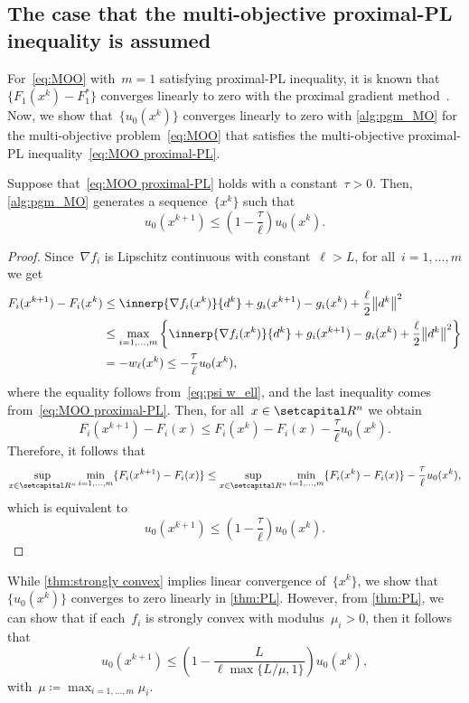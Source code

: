 \documentclass[../../main]{subfiles}
\begin{document}
\subsection{The case that the multi-objective proximal-PL inequality is assumed}
For~\cref{eq:MOO} with~$m = 1$ satisfying proximal-PL inequality, it is known that~$\{ F_1(x^k) - F_1^\ast \}$ converges linearly to zero with the proximal gradient method~\cite{Karimi2016}.
Now, we show that~$\{u_0(x^k)\}$ converges linearly to zero with \cref{alg:pgm_MO} for the multi-objective problem~\cref{eq:MOO} that satisfies the multi-objective proximal-PL inequality~\cref{eq:MOO proximal-PL}.
\begin{theorem} \label{thm:PL}
    Suppose that~\cref{eq:MOO proximal-PL} holds with a constant~$\tau > 0$.
    Then, \cref{alg:pgm_MO} generates a sequence~$\{ x^k \}$ such that
    \[
        u_0 (x^{k + 1}) \le \left( 1 - \frac{\tau}{\ell} \right) u_0(x^k).
    \]
\end{theorem}
\begin{proof}
    Since~$\nabla f_i$ is Lipschitz continuous with constant~$\ell > L$, for all~$i = 1, \dots, m$ we get
    \[
        \begin{split}
            F_i(x^{k + 1}) - F_i(x^k) &\le \innerp{\nabla f_i(x^k)}{d^k} + g_i(x^{k + 1}) - g_i(x^k) + \frac{\ell}{2}\norm*{ d^k}^2 \\
                                      &\le \max_{i = 1, \dots, m} \left\{ \innerp{\nabla f_i(x^k)}{d^k} + g_i(x^{k + 1}) - g_i(x^k) + \frac{\ell}{2}\norm*{ d^k}^2 \right\} \\
                                      &= - w_\ell(x^k)
        \le - \frac{\tau}{\ell} u_0(x^k)
        ,\end{split}
    \]
    where the equality follows from~\cref{eq:psi w_ell}, and the last inequality comes from~\cref{eq:MOO proximal-PL}.
    Then, for all~$x \in \setR^n$ we obtain
    \[
        F_i(x^{k + 1}) - F_i(x) \le F_i(x^k) - F_i(x) - \frac{\tau}{\ell} u_0(x^k)
    .\]
    Therefore, it follows that
    \[
        \sup_{x \in \setR^n} \min_{i = 1, \dots, m} \{ F_i(x^{k + 1}) - F_i(x) \} \le \sup_{x \in \setR^n} \min_{i = 1, \dots, m} \{ F_i(x^k) - F_i(x) \} - \frac{\tau}{\ell} u_0(x^k),
    \]
    which is equivalent to
    \[
        u_0 (x^{k + 1}) \le \left( 1 - \frac{\tau}{\ell} \right) u_0(x^k).
    \]
\end{proof}

\begin{remark}
    While \cref{thm:strongly convex} implies linear convergence of~$\{x^k\}$, we show that~$\{u_0(x^k)\}$ converges to zero linearly in \cref{thm:PL}.
    However, from \cref{thm:PL}, we can show that if each~$f_i$ is strongly convex with modulus~$\mu_i > 0$, then it follows that
    \[
        u_0 (x^{k + 1}) \le \left( 1 - \frac{L}{\ell \max \{L / \mu, 1\}} \right) u_0(x^k),
    \]
    with~$\mu \coloneqq \max_{i = 1, \dots, m} \mu_i$.
\end{remark}
\end{document}

